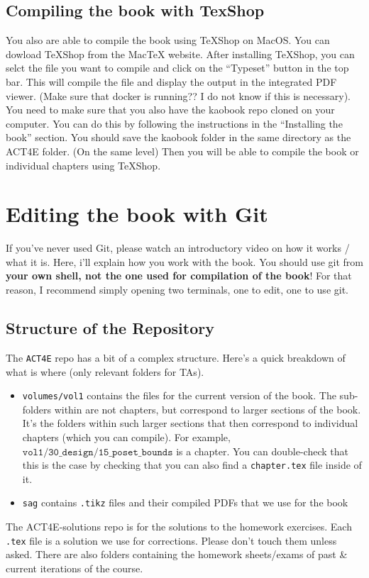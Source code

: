 \documentclass{article}
\begin{document}
    \subsection{Compiling the book with TexShop}
    You also are able to compile the book using TeXShop on MacOS.
    You can dowload TeXShop from the MacTeX website.
    After installing TeXShop, you can selct the file you want to compile and click on the ``Typeset'' button in the top bar.
    This will compile the file and display the output in the integrated PDF viewer.
    (Make sure that docker is running?? I do not know if this is necessary).
    You need to make sure that you also have the kaobook repo cloned on your computer.
    You can do this by following the instructions in the ``Installing the book'' section.
    You should save the kaobook folder in the same directory as the ACT4E folder.
    (On the same level) Then you will be able to compile the book or individual chapters using TeXShop.

    \section{Editing the book with Git}
    If you've never used Git, please watch an introductory video on how it works / what it is.
    Here, i'll explain how you work with the book.
    You should use git from \textbf{your own shell, not the one used for compilation of the book}! For that reason, I recommend simply opening two terminals, one to edit, one to use git.
    \subsection{Structure of the Repository}
    The \texttt{ACT4E} repo has a bit of a complex structure.
    Here's a quick breakdown of what is where (only relevant folders for TAs).
    \begin{itemize}
        \item \texttt{volumes/vol1} contains the files for the current version of the book.
              The sub-folders within are not chapters, but correspond to larger sections of the book.
              It's the folders within such larger sections that then correspond to individual chapters (which you can compile).
              For example, $\texttt{vol1/30\_design/15\_poset\_bounds}$ is a chapter.
              You can double-check that this is the case by checking that you can also find a \texttt{chapter.tex} file inside of it.
        \item \texttt{sag} contains \texttt{.tikz} files and their compiled PDFs that we use for the book
    \end{itemize}
    The ACT4E-solutions repo is for the solutions to the homework exercises.
    Each \texttt{.tex} file is a solution we use for corrections.
    Please don't touch them unless asked.
    There are also folders containing the homework sheets/exams of past \& current iterations of the course.
\end{document}
